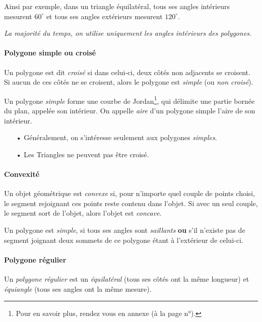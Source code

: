 \documentclass[a4paper, twoside]{article}
\begin{document}
Ainsi par exemple, dans un triangle équilatéral,
tous ses angles intérieurs mesurent $60^\circ$ et
tous ses angles extérieurs mesurent $120^\circ$.

\textit{La majorité du temps, on utilise uniquement les angles intérieurs des polygones.}

\paragraph*{Polygone simple ou croisé}

Un polygone est dit \emph{croisé} si dans celui-ci,
deux côtés non adjacents se croisent.
Si aucun de ces côtés ne se croisent, alors le polygone est \emph{simple} (ou \textit{non croisé}).

Un polygone \textit{simple} forme une courbe de Jordan\footnote{
	Pour en savoir plus,
	rendez vous en annexe (à la page n°\pageref*{courbe_Jordan}).},
qui délimite une partie bornée du plan, appelée son intérieur.
On appelle \emph{aire} d'un polygone simple l'aire de son intérieur.

\begin{itemize}
	\item[•] Généralement, on s'intéresse seulement aux polygones \textit{simples}.
	\item[•] Les Triangles ne peuvent pas être croisé.
\end{itemize}

\paragraph*{Convexité}

Un objet géométrique est \emph{convexe} si,
pour n'importe quel couple de points choisi,
le segment rejoignant ces points reste contenu dans l'objet.
Si avec un seul couple, le segment sort de l'objet,
alors l'objet est \emph{concave}.

Un polygone est \textit{simple},
si tous ses angles sont \textit{saillants} \textbf{ou}
s'il n'existe pas de segment joignant deux sommets de ce polygone étant à l'extérieur de celui-ci.

\paragraph*{Polygone régulier}

Un \emph{polygone régulier} est un \emph{équilatéral}
(tous ses côtés ont la même longueur) et \emph{équiangle}
(tous ses angles ont la même mesure).
\end{document}
